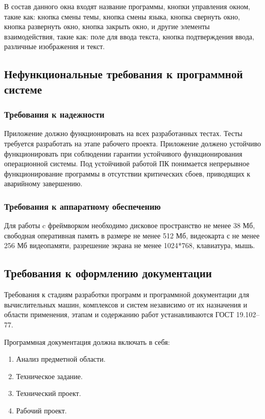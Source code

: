 В состав данного окна входят название программы, кнопки управления окном, такие как: кнопка смены темы, кнопка смены языка, кнопка свернуть окно, кнопка развернуть окно, кнопка закрыть окно, и другие элементы взаимодействия, такие как: поле для ввода текста, кнопка подтверждения ввода, различные изображения и текст.

\subsection{Нефункциональные требования к программной системе}

\subsubsection{Требования к надежности}
Приложение должно функционировать на всех разработанных тестах. Тесты требуется разработать на этапе рабочего проекта.
Приложение должено устойчиво функционировать при соблюдении гарантии устойчивого функционирования операционной системы. Под устойчивой работой ПК понимается непрерывное функционирование программы в отсутствии критических сбоев, приводящих к аварийному завершению.

\subsubsection{Требования к аппаратному обеспечению}

Для работы c фреймворком необходимо дисковое пространство не менее 38 Мб, свободная оперативная память в размере не менее 512 Мб, видеокарта с не менее 256 Мб видеопамяти, разрешение экрана не менее 1024*768, клавиатура, мышь.

\subsection{Требования к оформлению документации}

Требования к стадиям разработки программ и программной документации для вычислительных машин, комплексов и систем независимо от их назначения и области применения, этапам и содержанию работ устанавливаются ГОСТ 19.102–77.

Программная документация должна включать в себя:
\begin{enumerate}
	\item Анализ предметной области.
	\item Техническое задание.
	\item Технический проект.
	\item Рабочий проект.
\end{enumerate}

